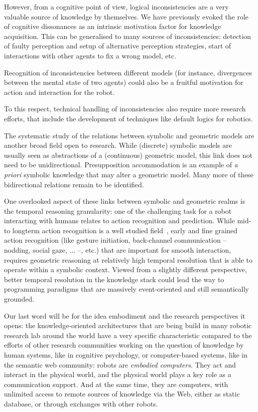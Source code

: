 However, from a cognitive point of view, logical inconsistencies are a very
valuable source of knowledge by themselves. We have previously evoked the role
of cognitive dissonances as an intrinsic motivation factor for knowledge
acquisition. This can be generalised to many sources of inconsistencies:
detection of faulty perception and setup of alternative perception strategies,
start of interactions with other agents to fix a wrong model, etc.

Recognition of inconsistencies between different models (for instance,
divergences between the mental state of two agents) could also be a fruitful
motivation for action and interaction for the robot.

To this respect, technical handling of inconsistencies also require more
research efforts, that include the development of techniques like default logics
for robotics.

\par

The systematic study of the relations between symbolic and geometric models are
another broad field open to research. While (discrete) symbolic models are
usually seen as abstractions of a (continuous) geometric model, this link does
not need to be unidirectional. Presupposition accommodation is an example of
{\it a priori} symbolic knowledge that may alter a geometric model. Many more
of these bidirectional relations remain to be identified.

One overlooked aspect of these links between symbolic and geometric realms is
the temporal reasoning granularity: one of the challenging task for a robot
interacting with humans relates to action recognition and prediction. While
mid- to longterm action recognition is a well studied field~\cite{Ghallab1996,
Johnson2005, Tenorth2011}, early and fine grained action recognition (like
gesture initiation, back-channel communication -- nodding, social gaze, ... --,
etc.) that are important for smooth interaction, requires geometric reasoning
at relatively high temporal resolution that is able to operate within a
symbolic context.  Viewed from a slightly different perspective, better
temporal resolution in the knowledge stack could lead the way to programming
paradigms that are massively event-oriented and still semantically grounded.

\par

Our last word will be for the idea embodiment and the research perspectives it
opens: the knowledge-oriented architectures that are being build in many
robotic research lab around the world have a very specific characteristic
compared to the efforts of other research communities working on the question
of knowledge by human systems, like in cognitive psychology, or computer-based
systems, like in the semantic web community: robots are \emph{embodied
computers}. They act and interact in the physical world, and the physical world
plays a key role as a communication support. And at the same time, they are
computers, with unlimited access to remote sources of knowledge via the Web,
either as static database, or through exchanges with other robots.

